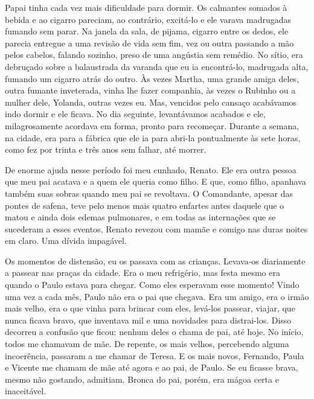 Papai tinha cada vez mais dificuldade para dormir.
Os calmantes somados à bebida e ao cigarro pareciam, ao contrário, excitá-lo e ele varava madrugadas fumando sem parar.
Na janela da sala, de pijama, cigarro entre os dedos, ele parecia entregue a uma revisão de vida sem fim, vez ou outra passando a mão pelos cabelos, falando sozinho, preso de uma angústia sem remédio.
No sítio, era debruçado sobre a balaustrada da varanda que eu ia encontrá-lo, madrugada alta, fumando um cigarro atrás do outro.
Às vezes Martha, uma grande amiga deles, outra fumante inveterada, vinha lhe fazer companhia, às vezes o Rubinho ou a mulher dele, Yolanda, outras vezes eu.
Mas, vencidos pelo cansaço acabávamos indo dormir e ele ficava.
No dia seguinte, levantávamos acabados e ele, milagrosamente acordava em forma, pronto para recomeçar.
Durante a semana, na cidade, era para a fábrica que ele ia para abri-la pontualmente às sete horas, como fez por trinta e três anos sem falhar, até morrer.


De enorme ajuda nesse período foi meu cunhado, Renato.
Ele era outra pessoa que meu pai acatava e a quem ele queria como filho.
E que, como filho, apanhava também suas sobras quando meu pai se revoltava.
O Comandante, apesar das pontes de safena, teve pelo menos mais quatro enfartes antes daquele que o matou e ainda dois edemas pulmonares, e em todas as internações que se sucederam a esses eventos, Renato revezou com mamãe e comigo nas duras noites em claro.
Uma dívida impagável.


Os momentos de distensão, eu os passava com as crianças.
Levava-os diariamente a passear nas praças da cidade.
Era o meu refrigério, mas festa mesmo era quando o Paulo estava para chegar.
Como eles esperavam esse momento! Vindo uma vez a cada mês, Paulo não era o pai que chegava.
Era um amigo, era o irmão mais velho, era o que vinha para brincar com eles, levá-los passear, viajar, que nunca ficava bravo, que inventava mil e uma novidades para distrai-los.
Disso decorreu a confusão que ficou: nenhum deles o chama de pai, até hoje.
No início, todos me chamavam de mãe.
De repente, os mais velhos, percebendo alguma incoerência, passaram a me chamar de Teresa.
E os mais novos, Fernando, Paula e Vicente me chamam de mãe até agora e ao pai, de Paulo.
Se eu ficasse brava, mesmo não gostando, admitiam.
Bronca do pai, porém, era mágoa certa e inaceitável.